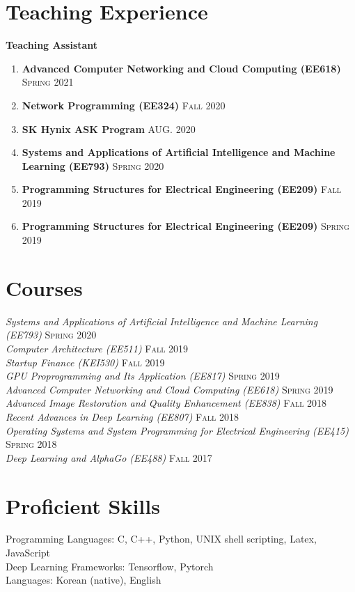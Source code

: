 \documentclass[margin,line,letter]{cv}
\def \pubitem {\vspace{0.08in}\item}
\begin{document}
\begin{resume}



\section{\sc Teaching Experience}
\textbf{Teaching Assistant}
\begin{enumerate}
	\pubitem{\textbf{Advanced Computer Networking and Cloud Computing (EE618)} \hfill \textsc{Spring} 2021}
	\pubitem{\textbf{Network Programming (EE324)} \hfill \textsc{Fall} 2020}
	\pubitem{\textbf{SK Hynix ASK Program} \hfill \textsc{AUG.} 2020}
	\pubitem{\textbf{Systems and Applications of Artificial Intelligence and Machine Learning (EE793)} \hfill 
\textsc{Spring} 2020}
	\pubitem{\textbf{Programming Structures for Electrical Engineering (EE209)} \hfill 
\textsc{Fall} 2019}
	\pubitem{\textbf{Programming Structures for Electrical Engineering (EE209)} \hfill 
\textsc{Spring} 2019}
\end{enumerate}

\vspace{0.5cm}

\section{\sc Courses}
\emph{Systems and Applications of Artificial Intelligence and Machine Learning (EE793)} \hfill \textsc{Spring} 2020 \\
\emph{Computer Architecture (EE511)} \hfill \textsc{Fall} 2019 \\
\emph{Startup Finance (KEI530)} \hfill \textsc{Fall} 2019 \\
\emph{GPU Proprogramming and Its Application (EE817)} \hfill \textsc{Spring} 2019 \\
\emph{Advanced Computer Networking and Cloud Computing (EE618)} \hfill \textsc{Spring} 2019 \\
\emph{Advanced Image Restoration and Quality Enhancement (EE838)} \hfill \textsc{Fall} 2018 \\
\emph{Recent Advances in Deep Learning (EE807)} \hfill \textsc{Fall} 2018 \\
\emph{Operating Systems and System Programming for Electrical Engineering (EE415)} \hfill \textsc{Spring} 2018 \\
\emph{Deep Learning and AlphaGo (EE488)} \hfill \textsc{Fall} 2017 \\


\section{\sc Proficient Skills \\}
Programming Languages: C, C++, Python, UNIX shell scripting, Latex, JavaScript \\
Deep Learning Frameworks: Tensorflow, Pytorch \\
Languages: Korean (native), English

\end{resume}
\end{document}
